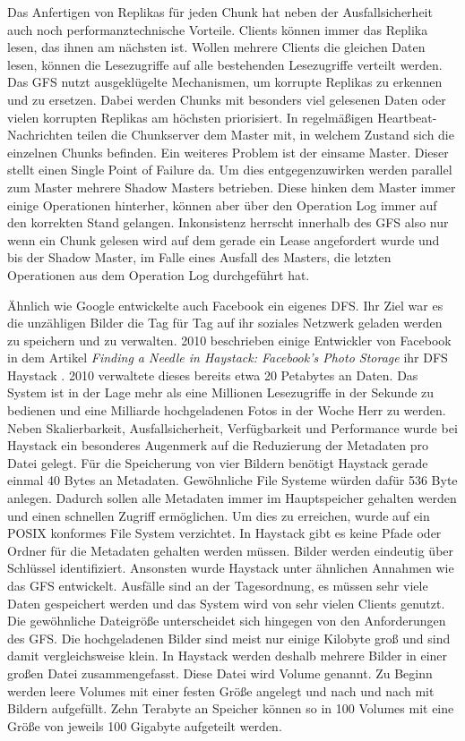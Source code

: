 \documentclass[12pt,oneside,a4paper,parskip]{scrbook}
\begin{document}
Das Anfertigen von Replikas für jeden Chunk hat neben der Ausfallsicherheit auch noch performanztechnische Vorteile. Clients können immer das Replika lesen, das ihnen am nächsten ist. Wollen mehrere Clients die gleichen Daten lesen, können die Lesezugriffe auf alle bestehenden Lesezugriffe verteilt werden. Das GFS nutzt ausgeklügelte Mechanismen, um korrupte Replikas zu erkennen und zu ersetzen. Dabei werden Chunks mit besonders viel gelesenen Daten oder vielen korrupten Replikas am höchsten priorisiert. In regelmäßigen Heartbeat-Nachrichten teilen die Chunkserver dem Master mit, in welchem Zustand sich die einzelnen Chunks befinden. Ein weiteres Problem ist der einsame Master. Dieser stellt einen Single Point of Failure da. Um dies entgegenzuwirken werden parallel zum Master mehrere Shadow Masters betrieben. Diese hinken dem Master immer einige Operationen hinterher, können aber über den Operation Log immer auf den korrekten Stand gelangen. Inkonsistenz herrscht innerhalb des GFS also nur wenn ein Chunk gelesen wird auf dem gerade ein Lease angefordert wurde und bis der Shadow Master, im Falle eines Ausfall des Masters, die letzten Operationen aus dem Operation Log durchgeführt hat.

Ähnlich wie Google entwickelte auch Facebook ein eigenes DFS. Ihr Ziel war es die unzähligen Bilder die Tag für Tag auf ihr soziales Netzwerk geladen werden zu speichern und zu verwalten. 2010 beschrieben einige Entwickler von Facebook in dem Artikel \textit{Finding a Needle in Haystack: Facebook's Photo Storage} ihr DFS Haystack \cite{haystack}. 2010 verwaltete dieses bereits etwa 20 Petabytes an Daten. Das System ist in der Lage mehr als eine Millionen Lesezugriffe in der Sekunde zu bedienen und eine Milliarde hochgeladenen Fotos in der Woche Herr zu werden. Neben Skalierbarkeit, Ausfallsicherheit, Verfügbarkeit und Performance wurde bei Haystack ein besonderes Augenmerk auf die Reduzierung der Metadaten pro Datei gelegt. Für die Speicherung von vier Bildern benötigt Haystack gerade einmal 40 Bytes an Metadaten. Gewöhnliche File Systeme würden dafür 536 Byte anlegen. Dadurch sollen alle Metadaten immer im Hauptspeicher gehalten werden und einen schnellen Zugriff ermöglichen. Um dies zu erreichen, wurde auf ein POSIX konformes File System verzichtet. In Haystack gibt es keine Pfade oder Ordner für die Metadaten gehalten werden müssen. Bilder werden eindeutig über Schlüssel identifiziert. Ansonsten wurde Haystack unter ähnlichen Annahmen wie das GFS entwickelt. Ausfälle sind an der Tagesordnung, es müssen sehr viele Daten gespeichert werden und das System wird von sehr vielen Clients genutzt. Die gewöhnliche Dateigröße unterscheidet sich hingegen von den Anforderungen des GFS. Die hochgeladenen Bilder sind meist nur einige Kilobyte groß und sind damit vergleichsweise klein. In Haystack werden deshalb mehrere Bilder in einer großen Datei zusammengefasst. Diese Datei wird Volume genannt. Zu Beginn werden leere Volumes mit einer festen Größe angelegt und nach und nach mit Bildern aufgefüllt. Zehn Terabyte an Speicher können so in 100 Volumes mit eine Größe von jeweils 100 Gigabyte aufgeteilt werden.
\end{document}

